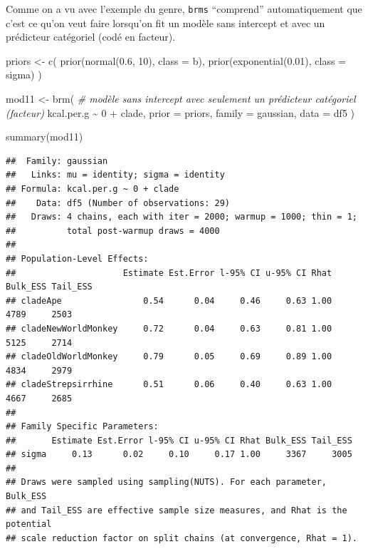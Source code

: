 \documentclass[
  a4paper,11pt,twoside,onecolumn,openright,final,oldfontcommands]{memoir}
\newenvironment{Shaded}{\begin{snugshade}}{\end{snugshade}}
\newcommand{\AttributeTok}[1]{\textcolor[rgb]{0.77,0.63,0.00}{#1}}
\newcommand{\CommentTok}[1]{\textcolor[rgb]{0.56,0.35,0.01}{\textit{#1}}}
\newcommand{\DecValTok}[1]{\textcolor[rgb]{0.00,0.00,0.81}{#1}}
\newcommand{\FloatTok}[1]{\textcolor[rgb]{0.00,0.00,0.81}{#1}}
\newcommand{\FunctionTok}[1]{\textcolor[rgb]{0.00,0.00,0.00}{#1}}
\newcommand{\NormalTok}[1]{#1}
\newcommand{\OtherTok}[1]{\textcolor[rgb]{0.56,0.35,0.01}{#1}}
\newcommand{\SpecialCharTok}[1]{\textcolor[rgb]{0.00,0.00,0.00}{#1}}
\theoremstyle{definition}
\theoremstyle{definition}
\theoremstyle{definition}
\theoremstyle{definition}
\theoremstyle{remark}
\begin{document}
Comme on a vu avec l'exemple du genre, \texttt{brms} ``comprend'' automatiquement que c'est ce qu'on veut faire lorsqu'on fit un modèle sans intercept et avec un prédicteur catégoriel (codé en facteur).

\begin{Shaded}
\begin{Highlighting}[]
\NormalTok{priors }\OtherTok{\textless{}{-}} \FunctionTok{c}\NormalTok{(}
  \FunctionTok{prior}\NormalTok{(}\FunctionTok{normal}\NormalTok{(}\FloatTok{0.6}\NormalTok{, }\DecValTok{10}\NormalTok{), }\AttributeTok{class =}\NormalTok{ b),}
  \FunctionTok{prior}\NormalTok{(}\FunctionTok{exponential}\NormalTok{(}\FloatTok{0.01}\NormalTok{), }\AttributeTok{class =}\NormalTok{ sigma)}
\NormalTok{  )}

\NormalTok{mod11 }\OtherTok{\textless{}{-}} \FunctionTok{brm}\NormalTok{(}
  \CommentTok{\# modèle sans intercept avec seulement un prédicteur catégoriel (facteur)}
\NormalTok{  kcal.per.g }\SpecialCharTok{\textasciitilde{}} \DecValTok{0} \SpecialCharTok{+}\NormalTok{ clade,}
  \AttributeTok{prior =}\NormalTok{ priors,}
  \AttributeTok{family =}\NormalTok{ gaussian,}
  \AttributeTok{data =}\NormalTok{ df5}
\NormalTok{  )}
\end{Highlighting}
\end{Shaded}

\begin{Shaded}
\begin{Highlighting}[]
\FunctionTok{summary}\NormalTok{(mod11)}
\end{Highlighting}
\end{Shaded}

\begin{verbatim}
##  Family: gaussian 
##   Links: mu = identity; sigma = identity 
## Formula: kcal.per.g ~ 0 + clade 
##    Data: df5 (Number of observations: 29) 
##   Draws: 4 chains, each with iter = 2000; warmup = 1000; thin = 1;
##          total post-warmup draws = 4000
## 
## Population-Level Effects: 
##                     Estimate Est.Error l-95% CI u-95% CI Rhat Bulk_ESS Tail_ESS
## cladeApe                0.54      0.04     0.46     0.63 1.00     4789     2503
## cladeNewWorldMonkey     0.72      0.04     0.63     0.81 1.00     5125     2714
## cladeOldWorldMonkey     0.79      0.05     0.69     0.89 1.00     4834     2979
## cladeStrepsirrhine      0.51      0.06     0.40     0.63 1.00     4667     2685
## 
## Family Specific Parameters: 
##       Estimate Est.Error l-95% CI u-95% CI Rhat Bulk_ESS Tail_ESS
## sigma     0.13      0.02     0.10     0.17 1.00     3367     3005
## 
## Draws were sampled using sampling(NUTS). For each parameter, Bulk_ESS
## and Tail_ESS are effective sample size measures, and Rhat is the potential
## scale reduction factor on split chains (at convergence, Rhat = 1).
\end{verbatim}
\end{document}
